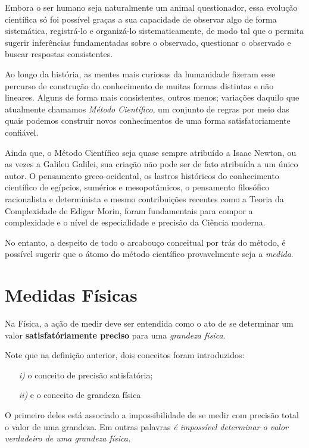 \documentclass[a4paper, 11pt]{report}
\begin{document}
Embora o ser humano seja naturalmente um animal questionador, essa evolução 
científica só foi possível graças a sua capacidade de observar algo de forma 
sistemática, registrá-lo e organizá-lo sistematicamente, de modo tal que o permita
sugerir inferências fundamentadas sobre o observado, questionar o observado e 
buscar respostas consistentes. 

Ao longo da história, as mentes mais curiosas da humanidade fizeram esse 
percurso de construção do conhecimento de muitas formas distintas e não 
lineares. Alguns de forma mais consistentes, outros menos; variações daquilo que
atualmente chamamos \emph{Método Científico}, um conjunto de regras por meio
das quais podemos construir novos conhecimentos de uma forma satisfatoriamente 
confiável. 

Ainda que, o Método Científico seja quase sempre atribuído a Isaac Newton, ou as
vezes a Galileu Galilei, sua criação não pode ser de fato atribuída a um único 
autor. O pensamento greco-ocidental, os lastros históricos do conhecimento 
científico de egípcios, sumérios e mesopotâmicos, o pensamento filosófico 
racionalista e determinista e mesmo contribuições recentes como a Teoria da 
Complexidade de Edigar Morin, foram fundamentais para compor a complexidade e o
nível de especialidade e precisão da Ciência moderna.

No entanto, a despeito de todo o arcabouço conceitual por trás do método, é 
possível sugerir que o átomo do método científico provavelmente seja a 
\emph{medida}. 

\section{Medidas Físicas}
Na Física, a ação de medir deve ser entendida como o ato de se determinar um 
valor \textbf{satisfatóriamente preciso} para uma \emph{grandeza física}.

Note que na definição anterior, dois conceitos foram introduzidos:
\begin{itemize}
    \item[\emph{i)}] o conceito de precisão satisfatória;
    \item[\emph{ii)}] e o conceito de grandeza física
\end{itemize}

O primeiro deles está associado a impossibilidade de se medir com precisão total
o valor de uma grandeza. Em outras palavras \emph{é impossível determinar o 
valor verdadeiro de uma grandeza física.} 
\end{document}
